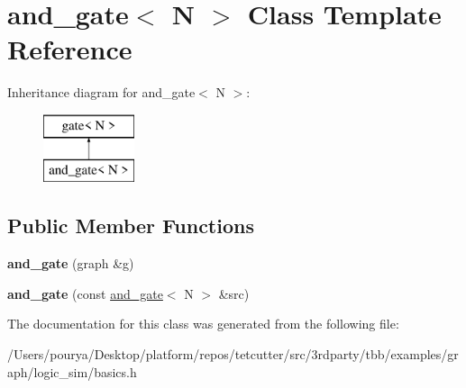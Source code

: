 \hypertarget{classand__gate}{}\section{and\+\_\+gate$<$ N $>$ Class Template Reference}
\label{classand__gate}
Inheritance diagram for and\+\_\+gate$<$ N $>$\+:\begin{figure}[H]
\begin{center}
\leavevmode
\includegraphics[height=2.000000cm]{classand__gate}
\end{center}
\end{figure}
\subsection*{Public Member Functions}
\begin{DoxyCompactItemize}
\item 
\hypertarget{classand__gate_acfbc5a0bc33810421f621a2c5d1cc9b1}{}{\bfseries and\+\_\+gate} (graph \&g)\label{classand__gate_acfbc5a0bc33810421f621a2c5d1cc9b1}

\item 
\hypertarget{classand__gate_a6642f69999c304812910e294e29f9715}{}{\bfseries and\+\_\+gate} (const \hyperlink{classand__gate}{and\+\_\+gate}$<$ N $>$ \&src)\label{classand__gate_a6642f69999c304812910e294e29f9715}

\end{DoxyCompactItemize}


The documentation for this class was generated from the following file\+:\begin{DoxyCompactItemize}
\item 
/\+Users/pourya/\+Desktop/platform/repos/tetcutter/src/3rdparty/tbb/examples/graph/logic\+\_\+sim/basics.\+h\end{DoxyCompactItemize}
